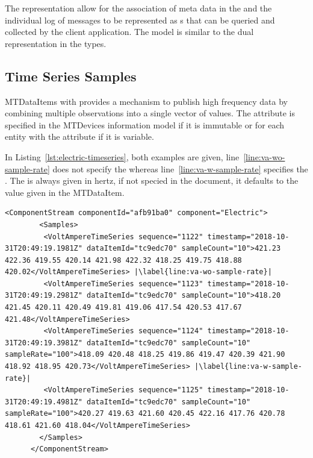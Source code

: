 The representation allow for the association of meta data in the  and the individual log of messages to be represented as s that can be queried and collected by the client application. The model is similar to the dual representation in the  types.

\subsection{Time Series Samples}

\glspl{MTDataItem} with   provides a mechanism to publish high frequency data by combining multiple observations into a single vector of values. The attribute  is specified in the \glspl{MTDevice} information model if it is immutable or for each entity with the attribute  if it is variable. 

In Listing~\ref{lst:electric-timeseries}, both examples are given, line~\ref{line:va-wo-sample-rate} does not specify the  whereas line~\ref{line:va-w-sample-rate} specifies the . The  is always given in hertz, if not specied in the  document, it defaults to the value given in the \gls{MTDataItem}.

\begin{lstlisting}[firstnumber=last,escapechar=|,%
    caption={Electric Component Time Series Example},label={lst:electric-timeseries}]
      <ComponentStream componentId="afb91ba0" component="Electric">
        <Samples>
         <VoltAmpereTimeSeries sequence="1122" timestamp="2018-10-31T20:49:19.1981Z" dataItemId="tc9edc70" sampleCount="10">421.23 422.36 419.55 420.14 421.98 422.32 418.25 419.75 418.88 420.02</VoltAmpereTimeSeries> |\label{line:va-wo-sample-rate}|
         <VoltAmpereTimeSeries sequence="1123" timestamp="2018-10-31T20:49:19.2981Z" dataItemId="tc9edc70" sampleCount="10">418.20 421.45 420.11 420.49 419.81 419.06 417.54 420.53 417.67 421.48</VoltAmpereTimeSeries>
         <VoltAmpereTimeSeries sequence="1124" timestamp="2018-10-31T20:49:19.3981Z" dataItemId="tc9edc70" sampleCount="10" sampleRate="100">418.09 420.48 418.25 419.86 419.47 420.39 421.90 418.92 418.95 420.73</VoltAmpereTimeSeries> |\label{line:va-w-sample-rate}|
         <VoltAmpereTimeSeries sequence="1125" timestamp="2018-10-31T20:49:19.4981Z" dataItemId="tc9edc70" sampleCount="10" sampleRate="100">420.27 419.63 421.60 420.45 422.16 417.76 420.78 418.61 421.60 418.04</VoltAmpereTimeSeries>
        </Samples>
      </ComponentStream>
\end{lstlisting}

